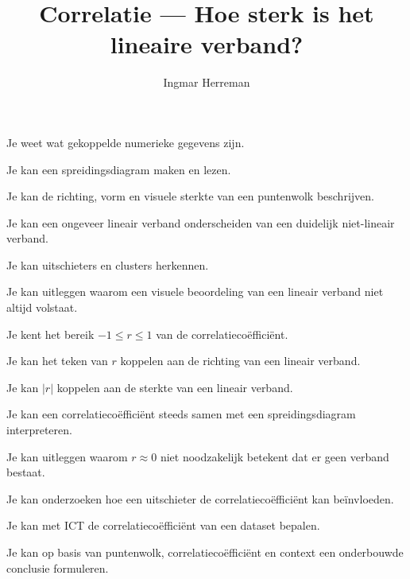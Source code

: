 \documentclass{ximera}
\title{Correlatie --- Hoe sterk is het lineaire verband?}
\author{Ingmar Herreman}
\begin{document}



















\maketitle

\begin{voorkennis}
  \item Je weet wat gekoppelde numerieke gegevens zijn.
  \item Je kan een spreidingsdiagram maken en lezen.
  \item Je kan de richting, vorm en visuele sterkte van een puntenwolk beschrijven.
  \item Je kan een ongeveer lineair verband onderscheiden van een duidelijk niet-lineair verband.
  \item Je kan uitschieters en clusters herkennen.
\end{voorkennis}

\begin{leerdoelen}
  \item Je kan uitleggen waarom een visuele beoordeling van een lineair verband niet altijd volstaat.
  \item Je kent het bereik $-1\leq r\leq 1$ van de correlatiecoëfficiënt.
  \item Je kan het teken van $r$ koppelen aan de richting van een lineair verband.
  \item Je kan $|r|$ koppelen aan de sterkte van een lineair verband.
  \item Je kan een correlatiecoëfficiënt steeds samen met een spreidingsdiagram interpreteren.
  \item Je kan uitleggen waarom $r\approx 0$ niet noodzakelijk betekent dat er geen verband bestaat.
  \item Je kan onderzoeken hoe een uitschieter de correlatiecoëfficiënt kan beïnvloeden.
  \item Je kan met ICT de correlatiecoëfficiënt van een dataset bepalen.
  \item Je kan op basis van puntenwolk, correlatiecoëfficiënt en context een onderbouwde conclusie formuleren.
\end{leerdoelen}
\end{document}

